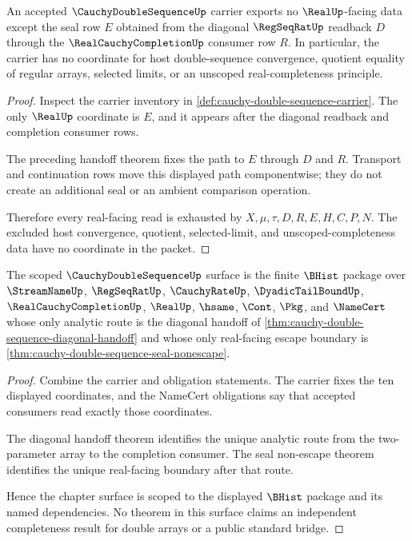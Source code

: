 \begin{theorem}\label{thm:cauchy-double-sequence-seal-nonescape}
An accepted $\CauchyDoubleSequenceUp$ carrier exports no $\RealUp$-facing data except the seal row $E$ obtained from the diagonal $\RegSeqRatUp$ readback $D$ through the $\RealCauchyCompletionUp$ consumer row $R$. In particular, the carrier has no coordinate for host double-sequence convergence, quotient equality of regular arrays, selected limits, or an unscoped real-completeness principle.
\end{theorem}
\begin{proof}
Inspect the carrier inventory in \autoref{def:cauchy-double-sequence-carrier}. The only $\RealUp$ coordinate is $E$, and it appears after the diagonal readback and completion consumer rows.

The preceding handoff theorem fixes the path to $E$ through $D$ and $R$. Transport and continuation rows move this displayed path componentwise; they do not create an additional seal or an ambient comparison operation.

Therefore every real-facing read is exhausted by $X,\mu,\tau,D,R,E,H,C,P,N$. The excluded host convergence, quotient, selected-limit, and unscoped-completeness data have no coordinate in the packet.
\end{proof}

\begin{theorem}\label{thm:cauchy-double-sequence-scope}
The scoped $\CauchyDoubleSequenceUp$ surface is the finite $\BHist$ package over $\StreamNameUp$, $\RegSeqRatUp$, $\CauchyRateUp$, $\DyadicTailBoundUp$, $\RealCauchyCompletionUp$, $\RealUp$, $\hsame$, $\Cont$, $\Pkg$, and $\NameCert$ whose only analytic route is the diagonal handoff of \autoref{thm:cauchy-double-sequence-diagonal-handoff} and whose only real-facing escape boundary is \autoref{thm:cauchy-double-sequence-seal-nonescape}.
\end{theorem}
\begin{proof}
Combine the carrier and obligation statements. The carrier fixes the ten displayed coordinates, and the NameCert obligations say that accepted consumers read exactly those coordinates.

The diagonal handoff theorem identifies the unique analytic route from the two-parameter array to the completion consumer. The seal non-escape theorem identifies the unique real-facing boundary after that route.

Hence the chapter surface is scoped to the displayed $\BHist$ package and its named dependencies. No theorem in this surface claims an independent completeness result for double arrays or a public standard bridge.
\end{proof}

